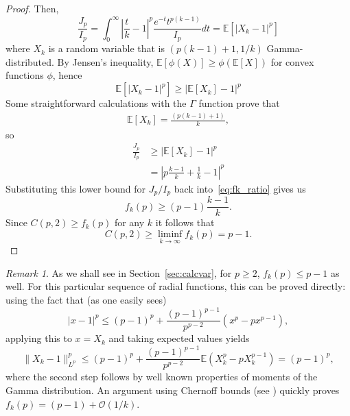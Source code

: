 \documentclass[11pt, a4paper]{amsart}
\theoremstyle{definition}
\theoremstyle{remark}
\newtheorem{remark}{Remark}
\newcommand{\abs}[1]{|#1|}
\begin{document}
\begin{proof}
Then,
\begin{equation}
\frac{J_p}{I_p}
= \int_0^\infty \left|\frac tk - 1\right|^p
\frac{e^{-t} t^{p(k-1)}}{I_p} dt
= \mathbb{E}[\abs{X_k - 1}^p] 
\end{equation}
where $X_k$ is a random variable that is
$(p(k-1)+1,1/k)$ Gamma-distributed.
By Jensen's inequality, $\mathbb{E}[\phi(X)]
\ge \phi(\mathbb{E}[X])$
for convex functions $\phi$, hence
\begin{equation}
\mathbb{E}[|X_k-1|^p] \ge \abs{\mathbb{E}[X_k] - 1}^p 
\end{equation}
Some straightforward calculations
with the $\Gamma$ function prove that
\begin{align*}
\mathbb{E}[X_k]= \frac{(p(k-1)+1)}k,
\end{align*}
so
\begin{align*}
\frac{J_p}{I_p}& \ge \abs{\mathbb{E}[X_k] - 1}^p \\
&= \left|p\frac{k-1}k+\frac1k-1\right|^p
\end{align*}
Substituting this lower bound for $J_p/I_p$ back
into~\eqref{eq:fk_ratio} gives us
\begin{equation*}
 f_k(p) \ge (p-1)\frac{k-1}{k}.
\end{equation*}
Since $C(p,2)\ge f_k(p)$ for any $k$ it follows that
\begin{equation*}
    C(p,2)\ge \liminf_{k\to \infty}f_k(p)=p-1.
\end{equation*}
\end{proof}
\begin{remark}
As we shall see in Section~\ref{sec:calcvar},
for $p\ge 2$, $f_k(p)\le p-1$ as well.
For this particular sequence of radial functions,
this can be proved directly: using the fact that 
(as one easily sees)
\begin{equation*}
    |x-1|^p\le
    (p-1)^p+\frac{(p-1)^{p-1}}{p^{p-2}}(x^p-px^{p-1}),
\end{equation*}
applying this to $x=X_k$ and
taking expected values yields
\begin{equation*}
    \|X_k-1\|_{L^p}^p\le (p-1)^p+
    \frac{(p-1)^{p-1}}{p^{p-2}}
    \mathbb E\left(X_k^p-pX_k^{p-1}\right)=(p-1)^p,
\end{equation*}
where the second step follows by well known 
properties of moments of the Gamma distribution. 
An argument using Chernoff bounds
(see \cite[Section 2.2]{Concentration})
quickly proves $f_k(p)
=(p-1)+\mathcal O\left(1/k \right)$.
\end{remark}
\end{document}
